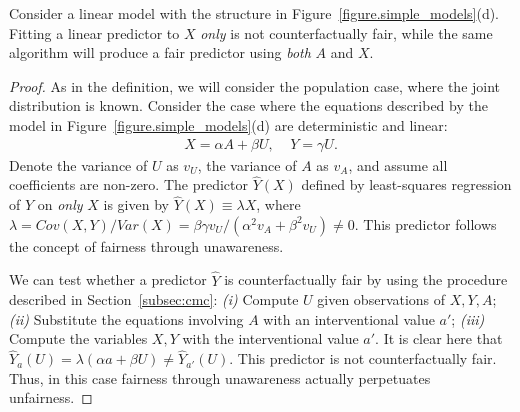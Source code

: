 \begin{lem}
Consider a linear model with the structure in
Figure~\ref{figure.simple_models}(d).  Fitting a linear predictor to
$X$ \emph{only} is not counterfactually fair, while the same algorithm
will produce a fair predictor using \emph{both} $A$ and $X$.
\end{lem}
%
\begin{proof}
As in the definition, we will consider the population case, where the
joint distribution is known. Consider the case where the equations
described by the model in Figure~\ref{figure.simple_models}(d)
are deterministic and linear:
\begin{align}
X = \alpha A + \beta U, \;\;\;\; Y = \gamma U. \nonumber
\end{align}
Denote the variance of $U$ as $v_U$, the variance of $A$ as $v_A$, and
assume all coefficients are non-zero. The predictor $\hat Y(X)$
defined by least-squares regression of $Y$ on \emph{only} $X$ is given
by $\hat Y(X) \equiv \lambda X$, where $\lambda = Cov(X, Y) / Var(X)
\!=\! \beta\gamma v_U / (\alpha^2 v_A + \beta^2 v_U) \neq 0$. This 
predictor follows the concept of fairness through unawareness.

We can test whether a predictor $\hat{Y}$ is counterfactually fair
by using the procedure described in Section~\ref{subsec:cmc}:
{\em (i)} Compute $U$ given observations of $X,Y,A$; %
{\em (ii)} Substitute the equations involving $A$ with an interventional value $a'$; 
{\em (iii)} Compute the variables $X,Y$ with the interventional value
$a'$. It is clear here that $\hat Y_a(U) \!=\! \lambda(\alpha a +
\beta U) \neq \hat Y_{a'}(U)$. This predictor is not counterfactually
fair. Thus, in this case fairness through unawareness actually
perpetuates unfairness.


\end{proof}
